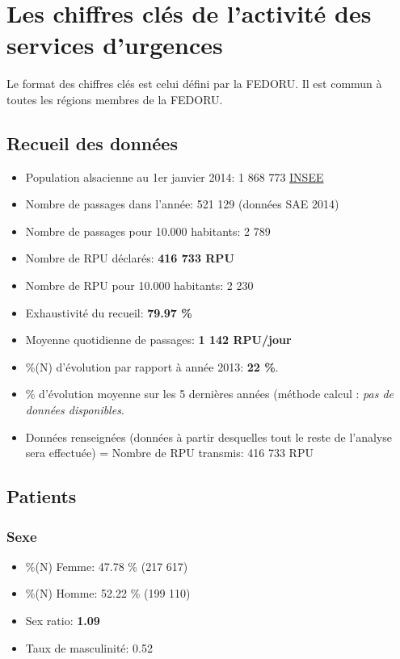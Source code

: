 \documentclass[]{article}
\begin{document}
\section{Les chiffres clés de l'activité des services
d'urgences}\label{les-chiffres-cles-de-lactivite-des-services-durgences}

Le format des chiffres clés est celui défini par la FEDORU. Il est
commun à toutes les régions membres de la FEDORU.

\subsection{Recueil des données}\label{recueil-des-donnees}

\begin{itemize}
\itemsep1pt\parskip0pt
\item
  Population alsacienne au 1er janvier 2014: 1 868 773 \href{}{INSEE}
\item
  Nombre de passages dans l'année: 521 129 (données SAE 2014)
\item
  Nombre de passages pour 10.000 habitants: 2 789
\item
  Nombre de RPU déclarés: \textbf{416 733 RPU}
\item
  Nombre de RPU pour 10.000 habitants: 2 230
\item
  Exhaustivité du recueil: \textbf{79.97 \%}
\item
  Moyenne quotidienne de passages: \textbf{1 142 RPU/jour}
\item
  \%(N) d'évolution par rapport à année 2013: \textbf{22 \%}.
\item
  \% d'évolution moyenne sur les 5 dernières années (méthode calcul :
  \emph{pas de données disponibles}.
\item
  Données renseignées (données à partir desquelles tout le reste de
  l'analyse sera effectuée) = Nombre de RPU transmis: 416 733 RPU
\end{itemize}

\subsection{Patients}\label{patients}

\subsubsection{Sexe}\label{sexe}

\begin{itemize}
\itemsep1pt\parskip0pt
\item
  \%(N) Femme: 47.78 \% (217 617)
\item
  \%(N) Homme: 52.22 \% (199 110)
\item
  Sex ratio: \textbf{1.09}
\item
  Taux de masculinité: 0.52
\end{itemize}
\end{document}
